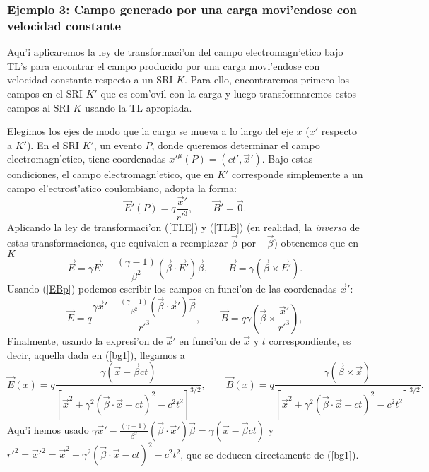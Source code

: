 \subsubsection{Ejemplo 3: Campo generado por una carga movi'endose con velocidad
constante}\label{secEjEBvc}
Aqu'i aplicaremos la ley de transformaci'on del campo electromagn'etico bajo
TL's para encontrar el campo producido por una carga movi'endose con velocidad
constante respecto a un SRI $K$. Para ello, encontraremos primero los campos en
el SRI $K'$ que es com'ovil con la carga y luego transformaremos estos campos
al SRI $K$ usando la TL apropiada.

Elegimos los ejes de modo que la carga se mueva a lo largo del eje $x$ ($x'$ respecto a
$K'$). En el SRI $K'$, un evento $P$, donde queremos determinar el campo
electromagn'etico, tiene coordenadas $x'^\mu(P)=(ct',\vec{x}')$. Bajo estas
condiciones, el campo electromagn'etico, que en $K'$ corresponde simplemente a
un campo el'ectrost'atico coulombiano, adopta la forma:
\begin{equation}
\vec{E}'(P)=q\frac{\vec{x}'}{r'^3}, \qquad \vec{B}' =\vec{0}. \label{EBp}
\end{equation}
Aplicando la ley de transformaci'on (\ref{TLE}) y (\ref{TLB}) (en realidad, la
\textit{inversa} de estas transformaciones, que equivalen a reemplazar
$\vec{\beta}$ por $-\vec{\beta}$) obtenemos que en $K$
\begin{equation}
\vec{E}=\gamma \vec{E}'-\frac{(\gamma -1)}{\beta^2}\left( \vec{\beta}\cdot
\vec{E}'\right) \vec{\beta} , \qquad
\vec{B}=\gamma \left(\vec{\beta}\times\vec{E}'\right).
\end{equation}
Usando (\ref{EBp}) podemos escribir los campos en funci'on de las coordenadas
$\vec{x}'$:
\begin{equation}
\vec{E}=q\frac{\gamma \vec{x}'-\frac{(\gamma -1)}{\beta^2}(\vec{\beta}\cdot
\vec{x}')\vec{\beta}}{r'^3}  , \qquad
\vec{B}=q\gamma \left(\vec{\beta}\times\frac{\vec{x}'}{r'^3}\right),
\end{equation}
Finalmente, usando la expresi'on de $\vec{x}'$ en funci'on de $\vec{x}$ y $t$
correspondiente, es decir, aquella dada en (\ref{bg1}), llegamos a
\begin{equation}\label{EBvx}
\vec{E}(x)=q\frac{\gamma\left( \vec{x}-\vec{\beta}ct\right)}
{\left[\vec{x}^2+\gamma^2\left(\vec{\beta}\cdot\vec{x}-ct\right)^2-c^2t^2\right]
^{3/2}}  , \qquad
\vec{B}(x)=q\frac{\gamma\left( \vec{\beta}\times\vec{x}\right) }
{\left[\vec{x}^2+\gamma^2\left(\vec{\beta}\cdot\vec{x}-ct\right)^2-c^2t^2\right]^{3/2}}.
\end{equation}
Aqu'i hemos usado $\gamma \vec{x}'-\frac{(\gamma -1)}{\beta^2}(\vec{\beta}\cdot
\vec{x}')\vec{\beta}=\gamma\left( \vec{x}-\vec{\beta}ct\right) $ y
$r'^2=\vec{x}'^2=\vec{x}^2+\gamma^2\left(\vec{\beta}\cdot\vec{x}-ct\right)^2-c^2t^2$, que se deducen directamente de (\ref{bg1}).

